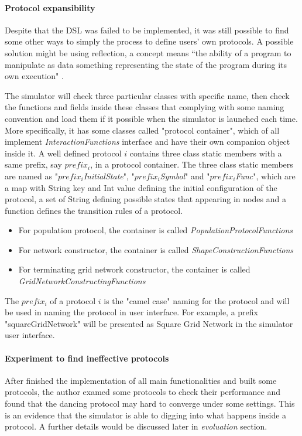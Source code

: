 \paragraph{Protocol expansibility}
Despite that the DSL was failed to be implemented, it was still possible to find some other ways to simply the process to define users' own protocols.
A possible solution might be using reflection, a concept means “the ability of a program to manipulate as data something representing the state of the
program during its own execution" \cite{reflection96}.
\par\noindent
The simulator will check three particular classes with specific name,
then check the functions and fields inside these classes that complying with some naming convention and load them if it possible when the simulator is launched each time.
More specifically, it has some classes called "protocol container", which of all implement \textit{InteractionFunctions} interface
and have their own companion object inside it. A well defined protocol $i$ contains three class static members with a same prefix, say $prefix_{i}$, in a protocol container.
The three class static members are named as "\textit{$prefix_{i}$InitialState}", "\textit{$prefix_{i}$Symbol}" and "\textit{$prefix_{i}$Func}", which are a map with String key and Int value defining the
initial configuration of the protocol, a set of String defining possible states that appearing in nodes and a function defines the transition rules of a protocol.
\begin{itemize}
  \item For population protocol, the container is called \textit{PopulationProtocolFunctions}
  \item For network constructor, the container is called \textit{ShapeConstructionFunctions}
  \item For terminating grid network constructor, the container is called \textit{GridNetworkConstructingFunctions}
\end{itemize}
\par\noindent
The $prefix_{i}$ of a protocol $i$ is the "camel case" naming for the protocol and will be used in naming the protocol in user interface. For example,
a prefix "squareGridNetwork" will be presented as Square Grid Network in the simulator user interface.

\paragraph{Experiment to find ineffective protocols}
After finished the implementation of all main functionalities and built some protocols, the author examed some protocols to check their performance
and found that the dancing protocol may hard to converge under some settings. This is an evidence that the simulator is able to digging into what happens inside
a protocol. A further details would be discussed later in \textit{evoluation} section.

